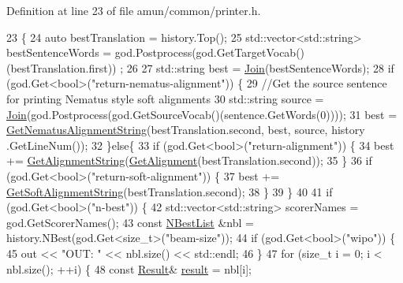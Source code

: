 Definition at line 23 of file amun/common/printer.\+h.


\begin{DoxyCode}
23                                                                                              \{ 
24   \textcolor{keyword}{auto} bestTranslation = history.Top();
25   std::vector<std::string> bestSentenceWords = god.Postprocess(god.GetTargetVocab()(bestTranslation.first))
      ;
26 
27   std::string best = \hyperlink{namespaceamunmt_a24dbaa0ef7dc1f1fcaa131a0f0eacb43}{Join}(bestSentenceWords);
28   \textcolor{keywordflow}{if} (god.Get<\textcolor{keywordtype}{bool}>(\textcolor{stringliteral}{"return-nematus-alignment"})) \{
29   \textcolor{comment}{//Get the source sentence for printing Nematus style soft alignments}
30   std::string source = \hyperlink{namespaceamunmt_a24dbaa0ef7dc1f1fcaa131a0f0eacb43}{Join}(god.Postprocess(god.GetSourceVocab()(sentence.GetWords(0))));
31     best = \hyperlink{namespaceamunmt_a589013f9c66aae2070326dc22d2b547d}{GetNematusAlignmentString}(bestTranslation.second, best, source, history
      .GetLineNum());
32   \}\textcolor{keywordflow}{else}\{
33     \textcolor{keywordflow}{if} (god.Get<\textcolor{keywordtype}{bool}>(\textcolor{stringliteral}{"return-alignment"})) \{
34       best += \hyperlink{namespaceamunmt_a33109e5a2b2adf93a3e60ef4197a85f9}{GetAlignmentString}(\hyperlink{namespaceamunmt_acf078c1279ce98077a069ba41811faa6}{GetAlignment}(bestTranslation.second));
35     \}
36     \textcolor{keywordflow}{if} (god.Get<\textcolor{keywordtype}{bool}>(\textcolor{stringliteral}{"return-soft-alignment"})) \{
37       best += \hyperlink{namespaceamunmt_a2cb8f571957aa136afe5b74340ecec52}{GetSoftAlignmentString}(bestTranslation.second);
38     \}
39   \}
40 
41   \textcolor{keywordflow}{if} (god.Get<\textcolor{keywordtype}{bool}>(\textcolor{stringliteral}{"n-best"})) \{
42     std::vector<std::string> scorerNames = god.GetScorerNames();
43     \textcolor{keyword}{const} \hyperlink{namespaceamunmt_a4ad8f6c25b18c8675040456c6e95e0f6}{NBestList} &nbl = history.NBest(god.Get<\textcolor{keywordtype}{size\_t}>(\textcolor{stringliteral}{"beam-size"}));
44     \textcolor{keywordflow}{if} (god.Get<\textcolor{keywordtype}{bool}>(\textcolor{stringliteral}{"wipo"})) \{
45       out << \textcolor{stringliteral}{"OUT: "} << nbl.size() << std::endl;
46     \}
47     \textcolor{keywordflow}{for} (\textcolor{keywordtype}{size\_t} i = 0; i < nbl.size(); ++i) \{
48       \textcolor{keyword}{const} \hyperlink{namespaceamunmt_af12bd731cf50f363bdcbec0f435bafb1}{Result}& \hyperlink{namespacetest2_a05591d1f1584c3b3d1490fc9ac7519a6}{result} = nbl[i];

\end{DoxyCode}
